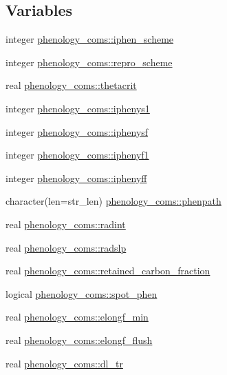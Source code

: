 \subsection*{Variables}
\begin{DoxyCompactItemize}
\item 
integer \hyperlink{namespacephenology__coms_a2ca32a4c957a13b3cda3244a0e726b9d}{phenology\+\_\+coms\+::iphen\+\_\+scheme}
\item 
integer \hyperlink{namespacephenology__coms_a1dcc0357eda3944d616e4ad9fab478c3}{phenology\+\_\+coms\+::repro\+\_\+scheme}
\item 
real \hyperlink{namespacephenology__coms_ac20b1ab903494138d73ddf0f1f0f4199}{phenology\+\_\+coms\+::thetacrit}
\item 
integer \hyperlink{namespacephenology__coms_aba2182caf031b818a58393da9d560986}{phenology\+\_\+coms\+::iphenys1}
\item 
integer \hyperlink{namespacephenology__coms_aaa5096d4b301c2ff2aee8ab606a666aa}{phenology\+\_\+coms\+::iphenysf}
\item 
integer \hyperlink{namespacephenology__coms_a623dc6984b539a7d43116e4ff97a19d3}{phenology\+\_\+coms\+::iphenyf1}
\item 
integer \hyperlink{namespacephenology__coms_a3cc397a234dd51493f3055e0e257737f}{phenology\+\_\+coms\+::iphenyff}
\item 
character(len=str\+\_\+len) \hyperlink{namespacephenology__coms_a533c334911241cc02bef0ae05f5e1adc}{phenology\+\_\+coms\+::phenpath}
\item 
real \hyperlink{namespacephenology__coms_aa7a0cd40eeb581ef9fd19cb3d4307482}{phenology\+\_\+coms\+::radint}
\item 
real \hyperlink{namespacephenology__coms_a90c70299bd2648e86392527bef4e132b}{phenology\+\_\+coms\+::radslp}
\item 
real \hyperlink{namespacephenology__coms_acc1fb86c65678f27282e7b01f99de998}{phenology\+\_\+coms\+::retained\+\_\+carbon\+\_\+fraction}
\item 
logical \hyperlink{namespacephenology__coms_ab745230c697d6ab4ef13d73bd14ae10c}{phenology\+\_\+coms\+::spot\+\_\+phen}
\item 
real \hyperlink{namespacephenology__coms_adc8fcd1ff7a762be61c01194ccfb81df}{phenology\+\_\+coms\+::elongf\+\_\+min}
\item 
real \hyperlink{namespacephenology__coms_adc22aefd17157caf3c2402946b4b135b}{phenology\+\_\+coms\+::elongf\+\_\+flush}
\item 
real \hyperlink{namespacephenology__coms_ac1225f64f8baed73ba5216809bc4d867}{phenology\+\_\+coms\+::dl\+\_\+tr}

\end{DoxyCompactItemize}
